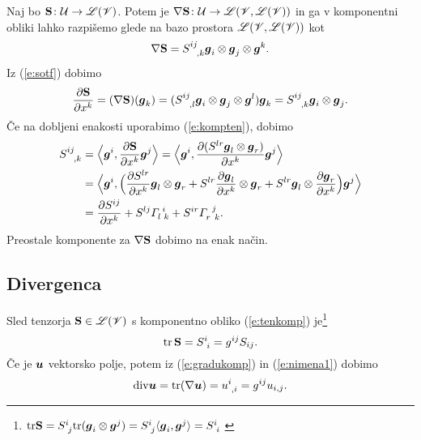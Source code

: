 Naj bo $\mathbf S\colon \mathcal U\to\mathscr L(\mathscr V)$. Potem je $\nabla\mathbf S\colon \mathcal U\to\mathscr L(\mathscr V,\mathscr L(\mathscr V))$
in ga v komponentni obliki lahko razpišemo glede na bazo prostora $\mathscr L(\mathscr V,\mathscr L(\mathscr V))$ kot
\[ \nabla\ten{S}=\topbot{S}{ij}{,k}\vek{g}_i\otimes\vek{g}_j\otimes\vek{g}^k. \]
Iz (\ref{e:sotf}) dobimo
\[
	\frac{\partial\ten{S}}{\partial x^k}=(\nabla\ten{S})(\vek{g}_k)=
	(\topbot{S}{ij}{,l}\vek{g}_i\otimes\vek{g}_j\otimes\vek{g}^l)\vek{g}_k=
	\topbot{S}{ij}{,k}\vek{g}_i\otimes\vek{g}_j.
\]
Če na dobljeni enakosti uporabimo (\ref{e:kompten}), dobimo
\begin{align*}
	\topbot{S}{ij}{,k}&=\Big<\vek{g}^i,\frac{\partial\ten{S}}{\partial x^k}\vek{g}^j\Big>=
	\Big<\vek{g}^i,\frac{\partial(S^{lr}\vek{g}_l\otimes\vek{g}_r)}{\partial x^k}\vek{g}^j\Big> \\
	&=\Big<\vek{g}^i,\Big(
	\frac{\partial S^{lr}}{\partial x^k}\vek{g}_l\otimes\vek{g}_r+
	S^{lr}\frac{\partial\vek{g}_l}{\partial x^k}\otimes\vek{g}_r+
	S^{lr}\vek{g}_l\otimes\frac{\partial\vek{g}_r}{\partial x^k}
	\Big)\vek{g}^j\Big> \\
	&=\frac{\partial S^{ij}}{\partial x^k}+S^{lj}\cs{l}{i}{k}+S^{ir}\cs{r}{j}{k}.
\end{align*}
Preostale komponente za $\nabla\mathbf S$ dobimo na enak način.


\subsection{Divergenca}


Sled tenzorja $\mathbf S\in\mathscr L(\mathscr V)$ s komponentno obliko (\ref{e:tenkomp})
je\footnote{$\tr\ten{S}=\topbot{S}{i}{j}\tr(\vek{g}_i\otimes\vek{g}^j)=
\topbot{S}{i}{j}\langle\vek{g}_i,\vek{g}^j\rangle=\topbot{S}{i}{i}$ \cite[str.~249]{liu}}
\[ \tr\,\ten{S}=\topbot{S}{i}{i}=g^{ij}S_{ij}. \]
Če je $\boldsymbol u$ vektorsko polje, potem iz (\ref{e:gradukomp}) in (\ref{e:nimena1}) dobimo
\begin{equation} \label{e:divu}
	\div\vek{u} = \tr(\nabla\vek{u}) = \topbot{u}{i}{,i} = g^{ij}u_{i,j}.
\end{equation}

